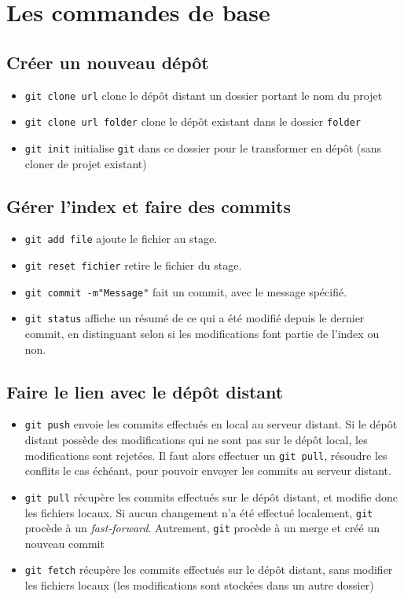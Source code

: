 \documentclass[french]{report}
\newcommand\itemb{\item[$\bullet$]}
\begin{document}
\section{Les commandes de base}

\subsection{Créer un nouveau dépôt}

\begin{itemize}
   \itemb \texttt{git clone url} clone le dépôt distant un dossier portant le nom du projet
    \itemb \texttt{git clone url folder} clone le dépôt existant dans le dossier \texttt{folder}
    \itemb \texttt{git init} initialise \texttt{git} dans ce dossier pour le transformer en dépôt (sans cloner de projet existant)
\end{itemize}

\subsection{Gérer l'index et faire des commits}

\begin{itemize}
    \itemb \texttt{git add file} ajoute le fichier au stage.
    \itemb \texttt{git reset fichier} retire le fichier du stage.
    \itemb \texttt{git commit -m"Message"} fait un commit, avec le message spécifié.
    \itemb \texttt{git status} affiche un résumé de ce qui a été modifié depuis le dernier commit, en distinguant selon si les modifications font partie de l'index ou non.
\end{itemize}

\subsection{Faire le lien avec le dépôt distant}

\begin{itemize}
    \itemb \texttt{git push} envoie les commits effectués en local au serveur distant.
    Si le dépôt distant possède des modifications qui ne sont pas sur le dépôt local, les modifications sont rejetées.
    Il faut alors effectuer un \texttt{git pull}, résoudre les conflits le cas échéant, pour pouvoir envoyer les commits au serveur distant.
    \itemb \texttt{git pull} récupère les commits effectués sur le dépôt distant, et modifie donc les fichiers locaux.
    Si aucun changement n'a été effectué localement, \texttt{git} procède à un \textit{fast-forward}.
    Autrement, \texttt{git} procède à un merge et créé un nouveau commit
    \itemb \texttt{git fetch} récupère les commits effectués sur le dépôt distant, sans modifier les fichiers locaux (les modifications sont stockées dans un autre dossier)
\end{itemize}
\end{document}
